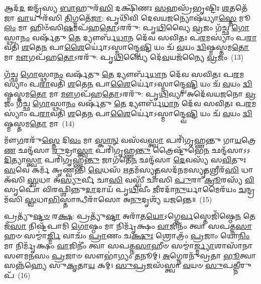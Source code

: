 {\anuvakamend[{\-\ul{𑌸}\-\-\ul{𑌵𑌿}\-𑌤𑌾 𑌦𑍍𑌵𑌾𑌵𑌿𑍞᳴𑌶𑌤𑌿𑌶𑍍𑌚}]}

𑌆𑌦᳴\-\ul{𑌦} 𑌇𑌨𑍍𑌦𑍍𑌰᳴𑌸𑍍𑌯 \ul{𑌬𑌾}\-𑌹𑍁𑌰᳴\-\ul{𑌸𑌿} 𑌦𑌕𑍍𑌷𑌿᳴𑌣𑌃 \ul{𑌸}\-𑌹𑌸𑍍𑌰᳴𑌭𑍃𑌷𑍍𑌟𑌿𑌃 \ul{𑌶}\-𑌤𑌤𑍇᳴𑌜𑌾 \ul{𑌵𑌾}\-𑌯𑍁𑌰᳴𑌸𑌿 \ul{𑌤𑌿}\-𑌗𑍍𑌮𑌤𑍇᳴\-\ul{𑌜𑌾}\-: 𑌪𑍃𑌥𑌿᳴𑌵𑌿 𑌦𑍇𑌵𑌯\-\ul{𑌜}\-𑌨𑍍𑌯𑍋𑌷᳴𑌧𑍍𑌯𑌾\-\ul{𑌸𑍍𑌤𑍇} 𑌮𑍂\-\ul{𑌲𑌂} 𑌮𑌾 𑌹𑌿𑍞᳴𑌸𑌿\-\ul{𑌷}\-𑌮𑌪᳴𑌹\-\ul{𑌤𑍋}\-\-𑌽𑌰𑌰𑍁᳴: 𑌪𑍃\-\ul{𑌥𑌿}\-𑌵𑍍𑌯𑍈 \ul{𑌵𑍍𑌰}\-𑌜𑌂 𑌗᳴𑌚𑍍𑌛 \ul{𑌗𑍋}\-𑌸𑍍𑌥𑌾\-\ul{𑌨𑌂} 𑌵𑌰𑍍\mbox{}𑌷᳴𑌤𑍁 \ul{𑌤𑍇} 𑌦𑍍𑌯𑍗𑌰𑍍𑌬᳴\-\ul{𑌧𑌾}\-𑌨 𑌦𑍇᳴𑌵 𑌸𑌵𑌿𑌤𑌃 𑌪\-\ul{𑌰}\-𑌮𑌸𑍍𑌯𑌾𑌂॑ 𑌪\-\ul{𑌰𑌾}\-𑌵𑌤𑌿᳴ \ul{𑌶}\-𑌤𑍇\-\ul{𑌨} 𑌪𑌾\-\ul{𑌶𑍈}\-𑌰𑍍𑌯𑍋॑\-𑌽𑌸𑍍𑌮𑌾𑌨𑍍𑌦𑍍𑌵𑍇\-\ul{𑌷𑍍𑌟𑌿} 𑌯𑌂 𑌚᳴ \ul{𑌵}\-𑌯𑌂 \ul{𑌦𑍍𑌵𑌿}\-𑌷𑍍𑌮𑌸𑍍𑌤𑌮\-\ul{𑌤𑍋} 𑌮𑌾 \ul{𑌮𑍗}\-𑌗𑌪᳴𑌹\-\ul{𑌤𑍋}\-\-𑌽𑌰𑌰𑍁᳴: 𑌪𑍃\-\ul{𑌥𑌿}\-𑌵𑍍𑌯𑍈 𑌦𑍇᳴\-\ul{𑌵}\-𑌯𑌜᳴𑌨𑍍𑌯𑍈 \ul{𑌵𑍍𑌰}\-𑌜𑌂~(13)

𑌗᳴𑌚𑍍𑌛 \ul{𑌗𑍋}\-𑌸𑍍𑌥𑌾\-\ul{𑌨𑌂} 𑌵𑌰𑍍\mbox{}𑌷᳴𑌤𑍁 \ul{𑌤𑍇} 𑌦𑍍𑌯𑍗𑌰𑍍𑌬᳴\-\ul{𑌧𑌾}\-𑌨 𑌦𑍇᳴𑌵 𑌸𑌵𑌿𑌤𑌃 𑌪\-\ul{𑌰}\-𑌮𑌸𑍍𑌯𑌾𑌂॑ 𑌪\-\ul{𑌰𑌾}\-𑌵𑌤𑌿᳴ \ul{𑌶}\-𑌤𑍇\-\ul{𑌨} 𑌪𑌾\-\ul{𑌶𑍈}\-𑌰𑍍𑌯𑍋॑\-𑌽𑌸𑍍𑌮𑌾𑌨𑍍𑌦𑍍𑌵𑍇\-\ul{𑌷𑍍𑌟𑌿} 𑌯𑌂 𑌚᳴ \ul{𑌵}\-𑌯𑌂 \ul{𑌦𑍍𑌵𑌿}\-𑌷𑍍𑌮𑌸𑍍𑌤𑌮\-\ul{𑌤𑍋} 𑌮𑌾 \ul{𑌮𑍗}\-𑌗𑌪᳴𑌹\-\ul{𑌤𑍋}\-\-𑌽𑌰𑌰𑍁᳴: 𑌪𑍃\-\ul{𑌥𑌿}\-𑌵𑍍𑌯𑌾 𑌅𑌦𑍇᳴𑌵𑌯𑌜𑌨𑍋 \ul{𑌵𑍍𑌰}\-𑌜𑌂 𑌗᳴𑌚𑍍𑌛 \ul{𑌗𑍋}\-𑌸𑍍𑌥𑌾\-\ul{𑌨𑌂} 𑌵𑌰𑍍\mbox{}𑌷᳴𑌤𑍁 \ul{𑌤𑍇} 𑌦𑍍𑌯𑍗𑌰𑍍𑌬᳴\-\ul{𑌧𑌾}\-𑌨 𑌦𑍇᳴𑌵 𑌸𑌵𑌿𑌤𑌃 𑌪\-\ul{𑌰}\-𑌮𑌸𑍍𑌯𑌾𑌂॑ 𑌪\-\ul{𑌰𑌾}\-𑌵𑌤𑌿᳴ \ul{𑌶}\-𑌤𑍇\-\ul{𑌨} 𑌪𑌾\-\ul{𑌶𑍈}\-𑌰𑍍𑌯𑍋॑\-𑌽𑌸𑍍𑌮𑌾𑌨𑍍𑌦𑍍𑌵𑍇\-\ul{𑌷𑍍𑌟𑌿} 𑌯𑌂 𑌚᳴ \ul{𑌵}\-𑌯𑌂 \ul{𑌦𑍍𑌵𑌿}\-𑌷𑍍𑌮𑌸𑍍𑌤𑌮\-\ul{𑌤𑍋} 𑌮𑌾~(14)

𑌮𑍗᳴\-\ul{𑌗}\-𑌰𑌰𑍁᳴\-\ul{𑌸𑍍𑌤𑍇} 𑌦𑌿\-\ul{𑌵𑌂} 𑌮𑌾 \ul{𑌸𑍍𑌕𑌾}\-\-\ul{𑌨𑍍} 𑌵𑌸᳴𑌵\-\ul{𑌸𑍍𑌤𑍍𑌵𑌾} 𑌪𑌰𑌿᳴𑌗𑍃𑌹𑍍𑌣𑌨𑍍𑌤𑍁 𑌗𑌾\-\ul{𑌯}\-𑌤𑍍𑌰𑍇\-\ul{𑌣} 𑌛𑌨𑍍𑌦᳴𑌸𑌾 \ul{𑌰𑍁}\-𑌦𑍍𑌰𑌾\-\ul{𑌸𑍍𑌤𑍍𑌵𑌾} 𑌪𑌰𑌿᳴𑌗𑍃𑌹𑍍𑌣\-\ul{𑌨𑍍𑌤𑍁} 𑌤𑍍𑌰𑍈𑌷𑍍𑌟𑍁᳴𑌭𑍇\-\ul{𑌨} 𑌛𑌨𑍍𑌦᳴𑌸𑌾\-𑌽\-𑌽\-\ul{𑌦𑌿}\-𑌤𑍍𑌯𑌾\-\ul{𑌸𑍍𑌤𑍍𑌵𑌾} 𑌪𑌰𑌿᳴𑌗𑍃𑌹𑍍𑌣\-\ul{𑌨𑍍𑌤𑍁} 𑌜𑌾𑌗᳴𑌤𑍇\-\ul{𑌨} 𑌛𑌨𑍍𑌦᳴𑌸𑌾 \ul{𑌦𑍇}\-𑌵𑌸𑍍𑌯᳴ 𑌸\-\ul{𑌵𑌿}\-𑌤𑍁𑌃 \ul{𑌸}\-𑌵𑍇 𑌕𑌰𑍍𑌮᳴ 𑌕𑍃𑌣𑍍𑌵𑌨𑍍𑌤𑌿 \ul{𑌵𑍇}\-𑌧𑌸᳴ \ul{𑌋}\-𑌤𑌮᳴𑌸𑍍𑌯𑍃\-\ul{𑌤}\-𑌸𑌦᳴𑌨𑌮𑌸𑍍𑌯𑍃\-\ul{𑌤}\-𑌶𑍍𑌰𑍀𑌰᳴\-\ul{𑌸𑌿} 𑌧𑌾 𑌅᳴𑌸𑌿 \ul{𑌸𑍍𑌵}\-𑌧𑌾 𑌅᳴\-\ul{𑌸𑍍𑌯𑍁}\-𑌰𑍍𑌵𑍀 𑌚𑌾\-\ul{𑌸𑌿} 𑌵𑌸𑍍𑌵𑍀᳴ 𑌚𑌾𑌸𑌿 \ul{𑌪𑍁}\-𑌰𑌾 \ul{𑌕𑍍𑌰𑍂}\-𑌰𑌸𑍍𑌯᳴ \ul{𑌵𑌿}\-𑌸𑍃𑌪𑍋᳴ 𑌵𑌿𑌰𑌫𑍍𑌶𑌿𑌨𑍍𑌨𑍁\-\ul{𑌦𑌾}\-𑌦𑌾𑌯᳴ 𑌪𑍃\-\ul{𑌥𑌿}\-𑌵𑍀𑌂 \ul{𑌜𑍀}\-𑌰𑌦𑌾᳴\-\ul{𑌨𑍁}\-𑌰𑍍𑌯𑌾𑌮𑍈𑌰᳴𑌯𑌂 \ul{𑌚}\-𑌨𑍍𑌦𑍍𑌰𑌮᳴𑌸𑌿 \ul{𑌸𑍍𑌵}\-𑌧𑌾\-\ul{𑌭𑌿}\-𑌸𑍍𑌤𑌾𑌨𑍍𑌧𑍀𑌰𑌾᳴𑌸𑍋 𑌅\-\ul{𑌨𑍁}\-𑌦𑍃𑌶𑍍𑌯᳴ 𑌯𑌜𑌨𑍍𑌤𑍇॥~(15)

{\anuvakamend[{\-\ul{𑌦𑍇}\-\-\ul{𑌵}\-𑌯𑌜᳴𑌨𑍍𑌯𑍈 \ul{𑌵𑍍𑌰}\-𑌜𑌨𑍍𑌤𑌮\-\ul{𑌤𑍋} 𑌮𑌾 𑌵𑌿᳴𑌰\-\ul{𑌫𑍍𑌶𑌿}\-𑌨𑍍𑌨𑍇𑌕𑌾᳴\-𑌦𑌶 𑌚}]}

𑌪𑍍𑌰𑌤𑍍𑌯𑍁᳴\-\ul{𑌷𑍍𑌟}\-\-\ul{𑍞} 𑌰\-\ul{𑌕𑍍𑌷}\-: 𑌪𑍍𑌰𑌤𑍍𑌯𑍁᳴\-\ul{𑌷𑍍𑌟𑌾} 𑌅𑌰𑌾᳴𑌤\-\ul{𑌯𑍋}\-\-𑌽𑌗𑍍𑌨𑍇\-\ul{𑌰𑍍𑌵}\-𑌸𑍍𑌤𑍇𑌜𑌿᳴𑌷𑍍𑌠𑍇\-\ul{𑌨} 𑌤𑍇𑌜᳴\-\ul{𑌸𑌾} 𑌨𑌿𑌷𑍍𑌟᳴𑌪𑌾𑌮𑌿 \ul{𑌗𑍋}\-𑌷𑍍𑌠𑌂 𑌮𑌾 𑌨𑌿𑌰𑍍𑌮𑍃᳴𑌕𑍍𑌷𑌂 \ul{𑌵𑌾}\-𑌜𑌿𑌨𑌂᳴ 𑌤𑍍𑌵𑌾 𑌸𑌪𑌤𑍍𑌨\-\ul{𑌸𑌾}\-𑌹𑍞 𑌸𑌮𑍍𑌮𑌾॑\-\ul{𑌰𑍍𑌜𑍍𑌮𑌿} 𑌵𑌾𑌚𑌂᳴ \ul{𑌪𑍍𑌰𑌾}\-𑌣𑌂 𑌚\-\ul{𑌕𑍍𑌷𑍁𑌃} 𑌶𑍍𑌰𑍋𑌤𑍍𑌰𑌂᳴ \ul{𑌪𑍍𑌰}\-𑌜𑌾𑌂 𑌯𑍋\-\ul{𑌨𑌿𑌂} 𑌮𑌾 𑌨𑌿𑌰𑍍𑌮𑍃᳴𑌕𑍍𑌷𑌂 \ul{𑌵𑌾}\-𑌜𑌿𑌨𑍀𑌂॑ 𑌤𑍍𑌵𑌾 𑌸𑌪𑌤𑍍𑌨\-\ul{𑌸𑌾}\-𑌹𑍀𑍞 𑌸𑌮𑍍𑌮𑌾॑\-\ul{𑌰𑍍𑌜𑍍𑌮𑍍𑌯𑌾}\-𑌶𑌾𑌸𑌾᳴𑌨𑌾 𑌸𑍗𑌮\-\ul{𑌨}\-𑌸𑌂 \ul{𑌪𑍍𑌰}\-𑌜𑌾𑍞 𑌸𑍗𑌭𑌾॑𑌗𑍍𑌯𑌂 \ul{𑌤}\-𑌨𑍂𑌮𑍍। \ul{𑌅}\-𑌗𑍍𑌨𑍇𑌰𑌨𑍁᳴𑌵𑍍𑌰𑌤𑌾 \ul{𑌭𑍂}\-𑌤𑍍𑌵𑌾 𑌸𑌨𑍍𑌨᳴𑌹𑍍𑌯𑍇 𑌸𑍁\-\ul{𑌕𑍃}\-𑌤𑌾\-\ul{𑌯} 𑌕𑌮𑍍। \ul{𑌸𑍁}\-\-\ul{𑌪𑍍𑌰}\-𑌜𑌸᳴𑌸𑍍𑌤𑍍𑌵𑌾 \ul{𑌵}\-𑌯𑍞 \ul{𑌸𑍁}\-𑌪\-\ul{𑌤𑍍𑌨𑍀}\-𑌰𑍁𑌪᳴~(16)

